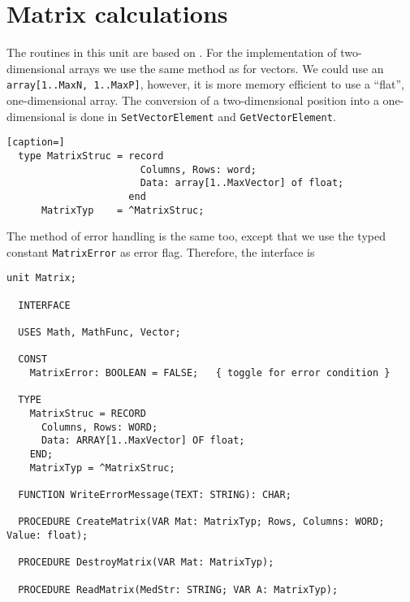 \chapter{Matrix calculations}
\begin{refsection}



The routines in this unit are based on \parencite{Pre-89,Atk-83,Bor-86,Eng-87,Sed-83,Ste-73,Ren-02}. For the implementation of two-dimensional arrays we use the same method as for vectors. We could use an \texttt{array[1..MaxN, 1..MaxP]}, however, it is more memory efficient to use a ``flat'', one-dimensional array. The conversion of a two-dimensional position  into a one-dimensional is done in \texttt{SetVectorElement} and \texttt{GetVectorElement}.

\begin{lstlisting}[caption=]
  type MatrixStruc = record
                       Columns, Rows: word;
                       Data: array[1..MaxVector] of float;
                     end
      MatrixTyp    = ^MatrixStruc;
\end{lstlisting}

The method of error handling is the same too, except that we use the typed constant \texttt{MatrixError} as error flag. Therefore, the interface is

\begin{lstlisting}[caption=Interface of unit Matrix]
  unit Matrix;

  INTERFACE

  USES Math, MathFunc, Vector;

  CONST
    MatrixError: BOOLEAN = FALSE;   { toggle for error condition }

  TYPE
    MatrixStruc = RECORD
      Columns, Rows: WORD;
      Data: ARRAY[1..MaxVector] OF float;
    END;
    MatrixTyp = ^MatrixStruc;

  FUNCTION WriteErrorMessage(TEXT: STRING): CHAR;

  PROCEDURE CreateMatrix(VAR Mat: MatrixTyp; Rows, Columns: WORD; Value: float);

  PROCEDURE DestroyMatrix(VAR Mat: MatrixTyp);

  PROCEDURE ReadMatrix(MedStr: STRING; VAR A: MatrixTyp);


\end{lstlisting}
\end{refsection}

